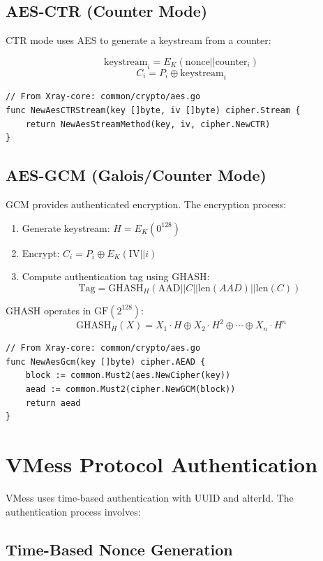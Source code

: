 \subsection{AES-CTR (Counter Mode)}

CTR mode uses AES to generate a keystream from a counter:

\[
\text{keystream}_i = E_K(\text{nonce} || \text{counter}_i)
\]
\[
C_i = P_i \oplus \text{keystream}_i
\]

\begin{verbatim}
// From Xray-core: common/crypto/aes.go
func NewAesCTRStream(key []byte, iv []byte) cipher.Stream {
    return NewAesStreamMethod(key, iv, cipher.NewCTR)
}
\end{verbatim}

\subsection{AES-GCM (Galois/Counter Mode)}

GCM provides authenticated encryption. The encryption process:

\begin{enumerate}
    \item Generate keystream: $H = E_K(0^{128})$
    \item Encrypt: $C_i = P_i \oplus E_K(\text{IV} || i)$
    \item Compute authentication tag using GHASH:
    \[
    \text{Tag} = \text{GHASH}_H(\text{AAD} || C || \text{len}(AAD) || \text{len}(C))
    \]
\end{enumerate}

GHASH operates in $\text{GF}(2^{128})$:
\[
\text{GHASH}_H(X) = X_1 \cdot H \oplus X_2 \cdot H^2 \oplus \cdots \oplus X_n \cdot H^n
\]

\begin{verbatim}
// From Xray-core: common/crypto/aes.go
func NewAesGcm(key []byte) cipher.AEAD {
    block := common.Must2(aes.NewCipher(key))
    aead := common.Must2(cipher.NewGCM(block))
    return aead
}
\end{verbatim}

\section{VMess Protocol Authentication}

VMess uses time-based authentication with UUID and alterId. The authentication process involves:

\subsection{Time-Based Nonce Generation}

